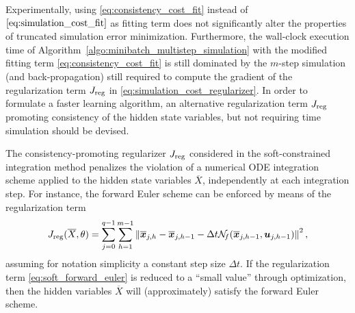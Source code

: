 \documentclass{article} %
\newcommand{\NN}{\mathcal{N}} %
\newcommand{\batchsize}{q}
\newcommand{\seqlen}{m}
\newcommand{\tens}[1]{\bm{#1}}
\newcommand{\hidden}[1]{\overline{#1}}
\newcommand{\norm}[1]{\left\lVert#1\right\rVert}
\begin{document}
Experimentally, using \eqref{eq:consistency_cost_fit} instead of $\eqref{eq:simulation_cost_fit}$ as fitting term does not significantly alter the properties of truncated simulation error minimization.
Furthermore, the wall-clock execution time of Algorithm~\ref{algo:minibatch_multistep_simulation} with the modified fitting term \eqref{eq:consistency_cost_fit} is still
 dominated by the $m$-step simulation (and back-propagation) still required to compute the gradient of  the regularization term $J_{\rm reg}$ in \eqref{eq:simulation_cost_regularizer}. 
In order to formulate a faster learning algorithm, an alternative 
regularization term $J_{\rm reg}$ promoting consistency of the hidden state variables, but not requiring time simulation should be devised.

 The consistency-promoting regularizer $J_{\rm reg}$ considered in the soft-constrained integration method penalizes the violation of a numerical ODE integration scheme applied to the hidden state variables $\hidden{X}$, independently at each integration step. 
For instance, the forward Euler scheme can be enforced by means of the regularization term 
\begin{equation}
\label{eq:soft_forward_euler}
J_{\rm reg}(\hidden{X}, \theta) =  \sum_{j=0}^{\batchsize-1}\sum_{h=1}^{\seqlen-1} \norm{ \hidden{\tens{x}}_{j,h} -
\hidden{\tens{x}}_{j,h-1} - \Delta t \NN_{\!f}(\hidden{\tens{x}}_{j,h-1}, \tens{u}_{j,h-1})}^2, 
\end{equation}
assuming for notation simplicity a constant step size $\Delta t$.
If the regularization term \eqref{eq:soft_forward_euler} is reduced to a ``small value'' through optimization, then the  hidden variables $\hidden{X}$ will (approximately) satisfy the forward Euler scheme.
\end{document}
